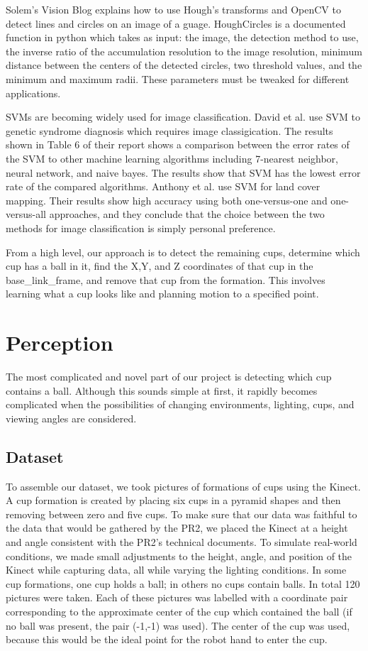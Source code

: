\documentclass[letterpaper, 10 pt, conference]{ieeeconf}  %
\begin{document}
Solem’s Vision Blog explains how to use Hough’s transforms and OpenCV to detect lines and circles on an image of a guage. HoughCircles is a documented function in python which takes as input: the image, the detection method to use, the inverse ratio of the accumulation resolution to the image resolution, minimum distance between the centers of the detected circles, two threshold values, and the minimum and maximum radii. These parameters must be tweaked for different applications.

SVMs are becoming widely used for image classification. David et al. use SVM to genetic syndrome diagnosis which requires image classigication. The results shown in Table 6 of their report shows a comparison between the error rates of the SVM to other machine learning algorithms including 7-nearest neighbor, neural network, and naive bayes. The results show that SVM has the lowest error rate of the compared algorithms. Anthony et al. use SVM for land cover mapping. Their results show high accuracy using both one-versus-one and one-versus-all approaches, and they conclude that the choice between the two methods for image classification is simply personal preference.

From a high level, our approach is to detect the remaining cups, determine which cup has a ball in it, find the X,Y, and Z coordinates of that cup in the base\_link\_frame, and remove that cup from the formation.  This involves learning what a cup looks like and planning motion to a specified point.

\section{Perception}
		
The most complicated and novel part of our project is detecting which cup contains a ball.  Although this sounds simple at first, it rapidly becomes complicated when the possibilities of changing environments, lighting, cups, and viewing angles are considered.

\subsection{Dataset}

To assemble our dataset, we took pictures of formations of cups using the Kinect.  A cup formation is created by placing six cups in a pyramid shapes and then removing between zero and five cups.  To make sure that our data was faithful to the data that would be gathered by the PR2, we placed the Kinect at a height and angle consistent with the PR2's technical documents.  To simulate real-world conditions, we made small adjustments to the height, angle, and position of the Kinect while capturing data, all while varying the lighting conditions.  In some cup formations, one cup holds a ball; in others no cups contain balls.  In total 120 pictures were taken.  Each of these pictures was labelled with a coordinate pair corresponding to the approximate center of the cup which contained the ball (if no ball was present, the pair (-1,-1) was used).  The center of the cup was used, because this would be the ideal point for the robot hand to enter the cup.
\end{document}

